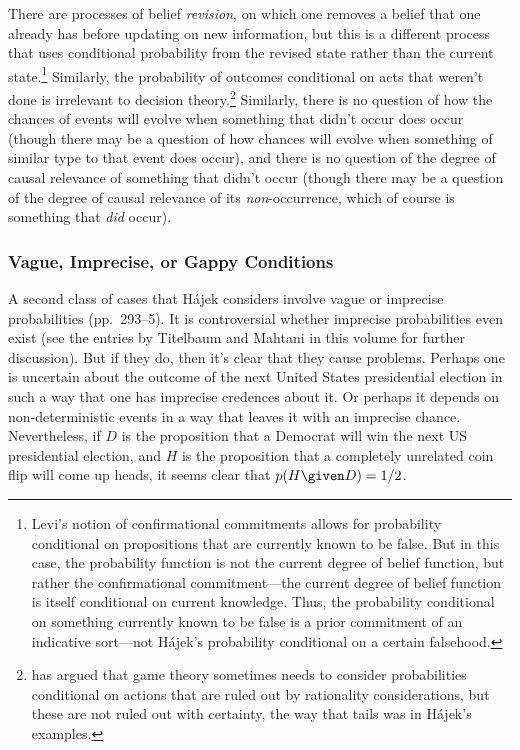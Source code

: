 There are processes of belief \emph{revision}, on which one removes a belief that one already has before updating on new information, but this is a different process that uses conditional probability from the revised state rather than the current state.\footnote{Levi's notion of confirmational commitments allows for probability conditional on propositions that are currently known to be false. But in this case, the probability function is not the current degree of belief function, but rather the confirmational commitment---the current degree of belief function is itself conditional on current knowledge. Thus, the probability conditional on something currently known to be false is a prior commitment of an indicative sort---not H\'{a}jek's probability conditional on a certain falsehood.} Similarly, the probability of outcomes conditional on acts that weren't done is irrelevant to decision theory.\footnote{\citet{brandenburger} has argued that game theory sometimes needs to consider probabilities conditional on actions that are ruled out by rationality considerations, but these are not ruled out with certainty, the way that tails was in H\'{a}jek's examples.} Similarly, there is no question of how the chances of events will evolve when something that didn't occur does occur (though there may be a question of how chances will evolve when something of similar type to that event does occur), and there is no question of the degree of causal relevance of something that didn't occur (though there may be a question of the degree of causal relevance of its \emph{non}-occurrence, which of course is something that \emph{did} occur).

\subsubsection{Vague, Imprecise, or Gappy Conditions}

A second class of cases that H\'{a}jek considers involve vague or imprecise probabilities (pp.\ 293--5). It is controversial whether imprecise probabilities even exist (see the entries by Titelbaum and Mahtani in this volume for further discussion). But if they do, then it's clear that they cause problems. Perhaps one is uncertain about the outcome of the next United States presidential election in such a way that one has imprecise credences about it. Or perhaps it depends on non-deterministic events in a way that leaves it with an imprecise chance. Nevertheless, if $D$ is the proposition that a Democrat will win the next US presidential election, and $H$ is the proposition that a completely unrelated coin flip will come up heads, it seems clear that $p(H \given D)=1/2$.

